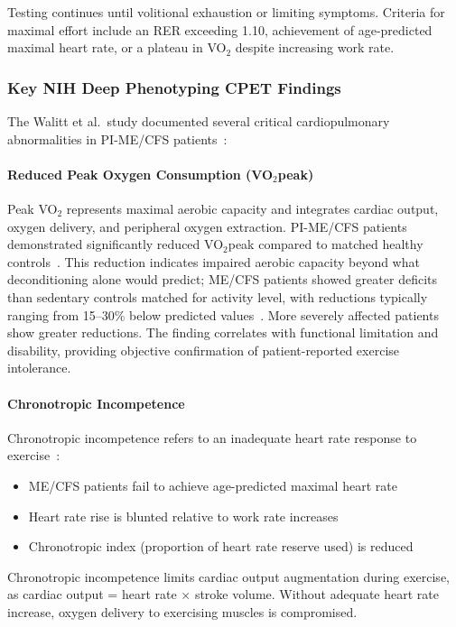 Testing continues until volitional exhaustion or limiting symptoms. Criteria for maximal effort include an RER exceeding 1.10, achievement of age-predicted maximal heart rate, or a plateau in VO$_2$ despite increasing work rate.

\subsubsection{Key NIH Deep Phenotyping CPET Findings}

The Walitt et al.\ study documented several critical cardiopulmonary abnormalities in PI-ME/CFS patients~\cite{walitt2024deep}:

\paragraph{Reduced Peak Oxygen Consumption (VO$_2$peak)}
Peak VO$_2$ represents maximal aerobic capacity and integrates cardiac output, oxygen delivery, and peripheral oxygen extraction. PI-ME/CFS patients demonstrated significantly reduced VO$_2$peak compared to matched healthy controls~\cite{walitt2024deep}. This reduction indicates impaired aerobic capacity beyond what deconditioning alone would predict; ME/CFS patients showed greater deficits than sedentary controls matched for activity level, with reductions typically ranging from 15--30\% below predicted values~\cite{keller2024cpet,Lim2020}. More severely affected patients show greater reductions. The finding correlates with functional limitation and disability, providing objective confirmation of patient-reported exercise intolerance.

\paragraph{Chronotropic Incompetence}
Chronotropic incompetence refers to an inadequate heart rate response to exercise~\cite{walitt2024deep}:

\begin{itemize}
    \item ME/CFS patients fail to achieve age-predicted maximal heart rate
    \item Heart rate rise is blunted relative to work rate increases
    \item Chronotropic index (proportion of heart rate reserve used) is reduced
\end{itemize}

Chronotropic incompetence limits cardiac output augmentation during exercise, as cardiac output = heart rate $\times$ stroke volume. Without adequate heart rate increase, oxygen delivery to exercising muscles is compromised.

